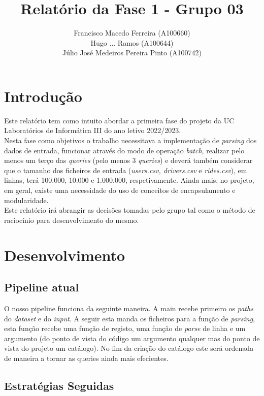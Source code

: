 \documentclass{article}
\title{Relatório da Fase 1 - Grupo 03}
\author{Francisco Macedo Ferreira (A100660)\\Hugo ... Ramos (A100644)\\Júlio José Medeiros Pereira Pinto (A100742)}
\begin{document}
    \maketitle

    \section{Introdução}

    Este relatório tem como intuito abordar a primeira fase do projeto da UC Laboratórios 
    de Informática III do ano letivo 2022/2023.\\
    Nesta fase como objetivos o trabalho necessitava a implementação de \emph{parsing} dos
    dados de entrada, funcionar através do modo de operação \emph{batch}, realizar pelo menos um terço das \emph{queries} (pelo menos 3 \emph{queries}) e deverá também considerar que o tamanho dos ficheiros de entrada (\emph{users.csv, drivers.csv} e \emph{rides.csv}), em linhas, terá 100.000, 10.000 e 1.000.000, respetivamente.
    Ainda mais, no projeto, em geral, existe uma necessidade do uso de conceitos de encapsulamento e modularidade.
    \\Este relatório irá abrangir as decisões tomadas pelo grupo tal como o método de raciocínio para desenvolvimento do mesmo.
    

    \section{Desenvolvimento}

        \subsection{Pipeline atual}
            O nosso pipeline funciona da seguinte maneira.
            A main recebe primeiro os \emph{paths} do \emph{dataset} e do \emph{input}.
            A seguir esta manda os ficheiros para a função de \emph{parsing}, esta função
            recebe uma função de registo, uma função de \emph{parse} de linha e um argumento 
            (do ponto de vista do código um argumento qualquer mas do ponto de vista do projeto um catálogo).
            No fim da criação do catálogo este será ordenada de maneira a tornar as 
            queries ainda mais efecientes.
            
        \subsection{Estratégias Seguidas}
\end{document}
